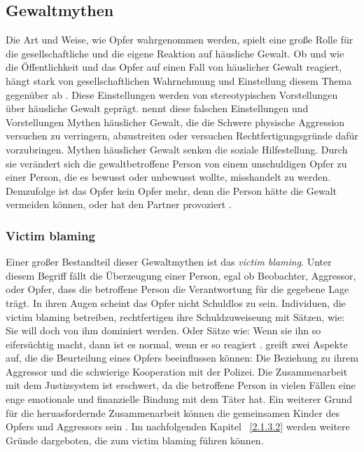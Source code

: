 \subsection{Gewaltmythen}   \label{subsec_2.1.3}
Die Art und Weise, wie Opfer wahrgenommen werden, spielt eine große Rolle für die gesellschaftliche und die eigene Reaktion auf häusliche Gewalt. Ob und wie die Öffentlichkeit und das Opfer auf einen Fall von häuslicher Gewalt reagiert, hängt stark von gesellschaftlichen Wahrnehmung und Einstellung diesem Thema gegenüber ab \parencite{Labelingtheory_plus}. Diese Einstellungen werden von stereotypischen Vorstellungen über häusliche Gewalt geprägt. \textcite{DVMAS_Peters} nennt diese falschen Einstellungen und Vorstellungen Mythen häuslicher Gewalt, die die Schwere physische Aggression versuchen zu verringern, abzustreiten oder versuchen Rechtfertigungsgründe dafür vorzubringen. Mythen häuslicher Gewalt senken die soziale Hilfestellung. Durch sie verändert sich die gewaltbetroffene Person von einem unschuldigen Opfer zu einer Person, die es bewusst oder unbewusst wollte, misshandelt zu werden. Demzufolge ist das Opfer kein Opfer mehr, denn die Person hätte die Gewalt vermeiden können, oder hat den Partner provoziert \parencite{DVMAS_Peters}.


\subsubsection{Victim blaming}     \label{2.1.3.1}
Einer großer Bestandteil dieser Gewaltmythen ist das \textit{victim blaming}. Unter diesem Begriff fällt die Überzeugung einer Person, egal ob Beobachter, Aggressor, oder Opfer, dass die betroffene Person die Verantwortung für die gegebene Lage trägt. In ihren Augen scheint das Opfer nicht Schuldlos zu sein. Individuen, die victim blaming betreiben, rechtfertigen ihre Schuldzuweiseung mit Sätzen, wie: Sie will doch von ihm dominiert werden. Oder Sätze wie: Wenn sie ihn so eifersüchtig macht, dann ist es normal, wenn er so reagiert \parencite{DVMAS_deutsch}. \textcite{victim_blaming} greift zwei Aspekte auf, die die Beurteilung eines Opfers beeinflussen können: Die Beziehung zu ihrem Aggressor und die schwierige Kooperation mit der Polizei. Die Zusammenarbeit mit dem Justizsystem ist erschwert, da die betroffene Person in vielen Fällen eine enge emotionale und finanzielle Bindung mit dem Täter hat. Ein weiterer Grund für die heruasfordernde Zusammenarbeit können die gemeinsamen Kinder des Opfers und Aggressors sein \parencite{victim_blaming}. Im nachfolgenden Kapitel ~\ref{2.1.3.2} werden weitere Gründe dargeboten, die zum victim blaming führen können.


